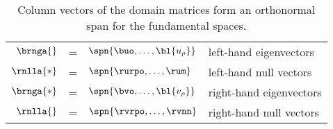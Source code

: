 \begin{table}[htdp]
\caption[Column vectors of the domain matrices form an orthonormal span for the fundamental spaces]{Column vectors of the domain matrices form an orthonormal span for the fundamental spaces.}
\begin{center}
\begin{tabular}{rcll}
%
  $\brnga{}$  & = & $\spn{\buo,\dots,{\bl{ u_{\rho} }}}$ & left-hand eigenvectors \\
%
  $\rnlla{*}$ & = & $\spn{\rurpo, \dots, \rum}$ & left-hand null vectors \\[10pt]
%
  $\brnga{*}$ & = & $\spn{\bvo,\dots,{\bl{ v_{\rho} }}}$ & right-hand eigenvectors \\
%
  $\rnlla{}$  & = & $\spn{\rvrpo, \dots, \rvnn}$ & right-hand null vectors \\
%
\end{tabular}
\end{center}
\label{tab:svd layout:b}
\end{table}

\endinput